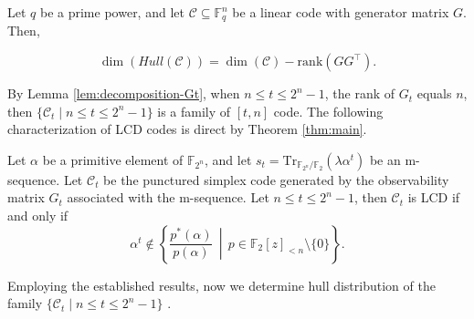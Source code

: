 \documentclass[hidelinks,onefignum,onetabnum]{siamart251216}
\theoremstyle{definition}
\theoremstyle{remark}
\providecommand{\rank}{{\mathrm{rank}}}
\providecommand{\Tr}{{\mathrm{Tr}}}
\providecommand{\F}{{\mathbb{F}}}
\begin{document}
\begin{proposition}\label{prop:hull-rank-formula}
	Let $q$ be a prime power, and let $\mathcal{C}\subseteq \F_q^n$ be a linear code with generator matrix $G$. Then,
	
	\[
	\dim(\textit{Hull}(\mathcal{C}))=\dim(\mathcal{C})-\rank(GG^\top).
	\]
\end{proposition}

 By Lemma \ref{lem:decomposition-Gt}, when $n\le t\le 2^{n}-1$, the rank of $G_{t}$ equals $n$, then $\{\mathcal{C}_{t}\mid n\le t\le 2^{n}-1\}$ is a family of $[t,n]$ code. The following characterization of LCD codes is direct by Theorem \ref{thm:main}.
 
 \begin{proposition}\label{prop:LCD-characterization-Ct}
 	Let $\alpha$ be a primitive element of $\mathbb{F}_{{2}^{n}}$, and let $s_t=\Tr_{\mathbb F_{2^n}/\mathbb F_2}(\lambda\alpha^t)$ be an  m-sequence. Let $\mathcal{C}_t$ be the punctured simplex code generated by the observability matrix $G_{t}$ associated with the m-sequence. Let $n\le t\le 2^n-1$, then $\mathcal{C}_t$ is LCD if and only if $$\alpha^t\notin 
 	\left\{
 	\frac{p^*(\alpha)}{p(\alpha)}
 	\,\middle|\,
 	p\in \mathbb F_2[z]_{<n}\setminus\{0\}
 	\right\}.
 	$$
 	
 \end{proposition}
 
  Employing the established results, now we determine hull distribution of the family $\{\mathcal{C}_{t}\mid n\le t\le 2^{n}-1\}$ . 
\end{document}
